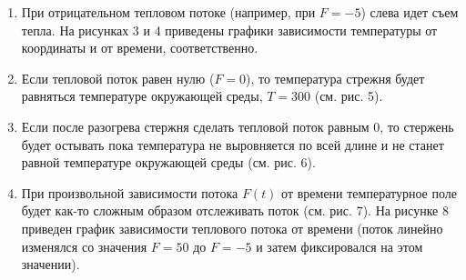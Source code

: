 \begin{enumerate}
	\item При отрицательном тепловом потоке (например, при $F = -5$) слева идет съем тепла. На рисунках 3 и 4 приведены графики зависимости температуры от координаты и от времени, соответственно.
	
	
	\item Если тепловой поток равен нулю ($F = 0$), то температура стрежня будет равняться температуре окружающей среды, $T = 300$ (см. рис. 5).
	
	
	\item Если после разогрева стержня сделать тепловой поток равным 0, то стержень будет остывать пока температура не выровняется по всей длине и не станет равной температуре окружающей среды (см. рис. 6).
	
	
	\item При  произвольной  зависимости потока $F(t)$ от  времени  температурное  поле будет как-то сложным образом отслеживать поток (см. рис. 7). На рисунке 8 приведен график зависимости теплового потока от времени (поток линейно изменялся со значения $F = 50$ до $F = -5$ и затем фиксировался на этом значении).
	
	
\end{enumerate}











